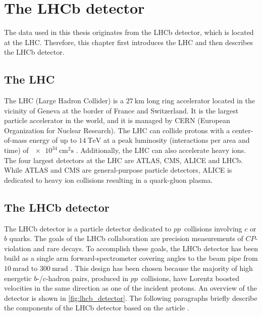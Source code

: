 \chapter{The LHCb detector}

The data used in this thesis originates from the LHCb detector, which is located at the LHC.
Therefore, this chapter first introduces the LHC and then describes the LHCb detector.

\section*{The LHC}

The LHC (Large Hadron Collider) is a $\qty{27}{\km}$ long ring accelerator located in the vicinity of Geneva at the border of France and Switzerland. 
It is the largest particle accelerator in the world, and it is managed by CERN (European Organization for Nuclear Research).
The LHC can collide protons with a center-of-mass energy of up to $\qty{14}{\TeV}$ at a peak luminosity (interactions per area and time) of $\qty{e34}{\cm\squared\s}$ \cite{LHC}.
Additionally, the LHC can also accelerate heavy ions.
The four largest detectors at the LHC are ATLAS, CMS, ALICE and LHCb.
While ATLAS and CMS are general-purpose particle detectors, ALICE is dedicated to heavy ion collisions resulting in a quark-gluon plasma.

\section*{The LHCb detector}

The LHCb detector is a particle detector dedicated to $pp$~collisions involving $c$ or $b$ quarks.
The goals of the LHCb collaboration are precision measurements of $C\!P$-violation and rare decays. 
To accomplish these goals, the LHCb detector has been build as a single arm forward-spectrometer covering angles to the beam pipe from $\qty{10}{\milli\radian}$ to $\qty{300}{\milli\radian}$ \cite{LHCb}. 
This design has been chosen because the majority of high energetic $b$-/$c$-hadron pairs, produced in $pp$~collisions, have Lorentz boosted velocities in the same direction as one of the incident protons.
An overview of the detector is shown in \autoref{fig:lhcb_detector}.
The following paragraphs briefly describe the components of the LHCb detector based on the article \cite{LHCb}.

